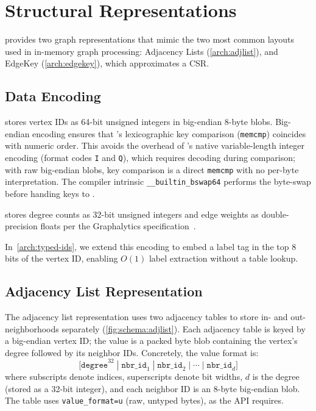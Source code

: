 \section{Structural Representations}
\label{arch:structural-reps}

\project{} provides two graph representations that mimic the two most common layouts used in in-memory graph processing: Adjacency Lists (\autoref{arch:adjlist}), and EdgeKey (\autoref{arch:edgekey}), which approximates a \ac{CSR}.

\subsection{Data Encoding}
\label{arch:data-encoding}

\project{} stores vertex IDs as 64-bit unsigned integers in big-endian 8-byte blobs.
Big-endian encoding ensures that \wt{}'s lexicographic key comparison (\texttt{memcmp}) coincides with numeric order.
This avoids the overhead of \wt{}'s native variable-length integer encoding (format codes \texttt{I} and \texttt{Q}), which requires decoding during comparison; with raw big-endian blobs, key comparison is a direct \texttt{memcmp} with no per-byte interpretation.
The compiler intrinsic \texttt{\_\_builtin\_bswap64} performs the byte-swap before handing keys to \wt{}.

\project{} stores degree counts as 32-bit unsigned integers and edge weights as double-precision floats per the Graphalytics specification~\cite{capotua2015graphalytics}.

In~\autoref{arch:typed-ids}, we extend this encoding to embed a label tag in the top 8 bits of the vertex ID, enabling $O(1)$ label extraction without a table lookup.

\subsection{Adjacency List Representation}
\label{arch:adjlist}

The adjacency list representation uses two adjacency tables to store in- and out-neighborhoods separately (\autoref{fig:schema:adjlist}).
Each adjacency table is keyed by a big-endian vertex ID; the value is a packed byte blob containing the vertex's degree followed by its neighbor IDs.
Concretely, the value format is:
\[
  \texttt{[degree}^{32} \;|\; \texttt{nbr\_id}_1 \;|\; \texttt{nbr\_id}_2 \;|\; \cdots \;|\; \texttt{nbr\_id}_{d}\texttt{]}
\]
where subscripts denote indices, superscripts denote bit widths, $d$ is the degree (stored as a 32-bit integer), and each neighbor ID is an 8-byte big-endian blob.
The table uses \texttt{value\_format=u} (raw, untyped bytes), as the  API requires.

